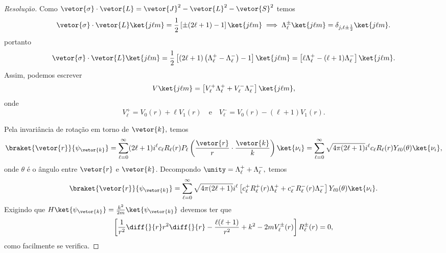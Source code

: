 \begin{proof}[Resolução]
   Como \(\vetor{\sigma} \cdot \vetor{L} = \vetor{J}^2 - \vetor{L}^2 - \vetor{S}^2\) temos
   \begin{equation*}
      \vetor{\sigma} \cdot \vetor{L} \ket{j \ell m} = \frac12 \left[\pm(2\ell + 1) - 1\right] \ket{j \ell m}
      \implies \Lambda_{\ell}^{\pm}\ket{j \ell m} = \delta_{j, \ell \pm \frac12} \ket{j \ell m}.
   \end{equation*}
   portanto
   \begin{equation*}
      \vetor{\sigma} \cdot \vetor{L} \ket{j \ell m} = \frac12\left[(2\ell + 1) \left(\Lambda_\ell^+ - \Lambda_\ell^-\right) - 1\right]\ket{j \ell m} = \left[\ell \Lambda_\ell^+ - (\ell + 1)\Lambda_\ell^-\right]\ket{j \ell m}.
   \end{equation*}
   Assim, podemos escrever
   \begin{equation*}
      V\ket{j\ell m} = \left[V^+_\ell \Lambda^+_\ell + V^-_{\ell} \Lambda^{-}_\ell\right]\ket{j\ell m},
   \end{equation*}
   onde 
   \begin{equation*}
      V^+_\ell = V_0(r) + \ell V_1(r)
      \quad\text{e}\quad
      V^-_\ell = V_0(r) - (\ell+1) V_1(r).
   \end{equation*}

   Pela invariância de rotação em torno de \(\vetor{k},\) temos
   \begin{equation*}
      \braket{\vetor{r}}{\psi_{\vetor{k}}} = \sum_{\ell = 0}^\infty (2\ell + 1)i^\ell c_\ell R_\ell(r) P_\ell\left(\frac{\vetor{r}}{r}\cdot \frac{\vetor{k}}{k}\right) \ket{\nu_i} = \sum_{\ell = 0}^\infty \sqrt{4\pi (2\ell + 1)} i^\ell c_\ell R_{\ell}(r) Y_{\ell 0}(\theta) \ket{\nu_i},
   \end{equation*}
   onde \(\theta\) é o ângulo entre \(\vetor{r}\) e \(\vetor{k}\). Decompondo \(\unity = \Lambda_\ell^{+} + \Lambda_\ell^{-},\) temos
   \begin{equation*}
      \braket{\vetor{r}}{\psi_{\vetor{k}}} = \sum_{\ell = 0}^\infty \sqrt{4\pi (2\ell + 1)} i^{\ell} \left[c_\ell^+R_\ell^{+}(r) \Lambda_{\ell}^+ + c_\ell^{-} R_{\ell}^{-}(r) \Lambda_{\ell}^-\right]Y_{\ell 0}(\theta) \ket{\nu_i}.
   \end{equation*}
   Exigindo que \(H \ket{\psi_{\vetor{k}}} = \frac{k^2}{2m}\ket{\psi_{\vetor{k}}}\) devemos ter que
   \begin{equation*}
      \left[\frac{1}{r^2} \diff{}{r}r^2 \diff{}{r} - \frac{\ell (\ell + 1)}{r^2} + k^2 - 2m V_{\ell}^{\pm}(r)\right]R_{\ell}^{\pm}(r) = 0,
   \end{equation*}
   como facilmente se verifica.


\end{proof}
